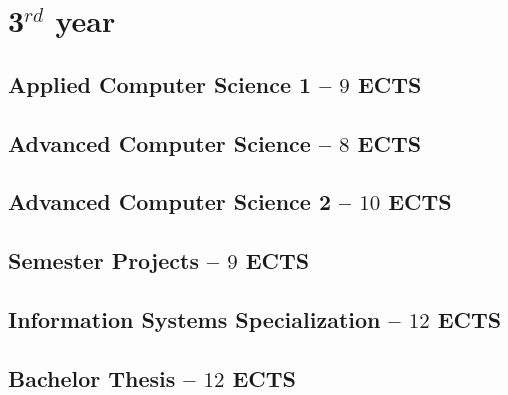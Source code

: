 \documentclass[11pt]{article}
\newcommand{\module}[2]{
    \subsection[#1]{#1 \small -- $#2$ ECTS}
}
\begin{document}
%
%
\section{3$^{rd}$ year}
\module{Applied Computer Science 1}{9}
\pagebreak

\module{Advanced Computer Science}{8}
\pagebreak
\pagebreak
\module{Advanced Computer Science 2}{10}
\pagebreak
\pagebreak

\module{Semester Projects}{9}
\module{Information Systems Specialization}{12}
\module{Bachelor Thesis}{12}
\end{document}
